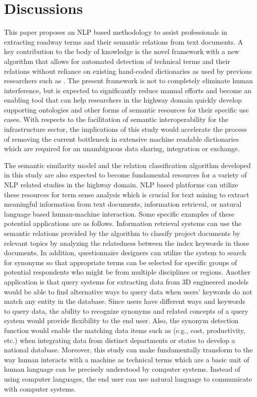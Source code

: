 \documentclass[Journal, BackFigs,NoLists, DoubleSpace]{ascelike}%
\begin{document}
\section{Discussions} \label{sec:dis}
This paper proposes an NLP based methodology to assist professionals in extracting roadway terms and their semantic relations from text documents. A key contribution to the body of knowledge is the novel framework with a new algorithm that allows for automated detection of technical terms and their relations without reliance on existing hand-coded dictionaries as used by previous researchers such as . The present framework is not to completely eliminate human interference, but is expected to significantly reduce manual efforts and become an enabling tool that can help researchers in the highway domain quickly develop supporting ontologies and other forms of semantic resources for their specific use cases. With respects to the facilitation of semantic interoperability for the infrastructure sector, the implications of this study would accelerate the process of removing the current bottleneck in extensive machine readable dictionaries which are required for an unambiguous data sharing, integration or exchange. 
\par
The semantic similarity model and the relation classification algorithm developed in this study are also expected to become fundamental resources for a variety of NLP related studies in the highway domain. NLP based platforms can utilize these resources for term sense analysis which is crucial for text mining to extract meaningful information from text documents, information retrieval, or natural language based human-machine interaction. Some specific examples of these potential applications are as follows. Information retrieval systems can use the semantic relations provided by the algorithm to classify project documents by relevant topics by analyzing the relatedness between the index keywords in those documents. In addition, questionnaire designers can utilize the system to search for synonyms so that appropriate terms can be selected for specific groups of potential respondents who might be from multiple disciplines or regions. Another application is that query systems for extracting data from 3D engineered models would be able to find alternative ways to query data when users' keywords do not match any entity in the database. Since users have different ways and keywords to query data, the ability to recognize synonyms and related concepts of a query system would provide flexibility to the end user. Also, the synonym detection function would enable the matching data items such as (e.g., cost, productivity, etc.) when integrating data from distinct departments or states to develop a national database. Moreover, this study can make fundamentally transform to the way human interacts with a machine as technical terms which are a basic unit of human language can be precisely understood by computer systems. Instead of using computer languages, the end user can use natural language to communicate with computer systems.
\end{document}
